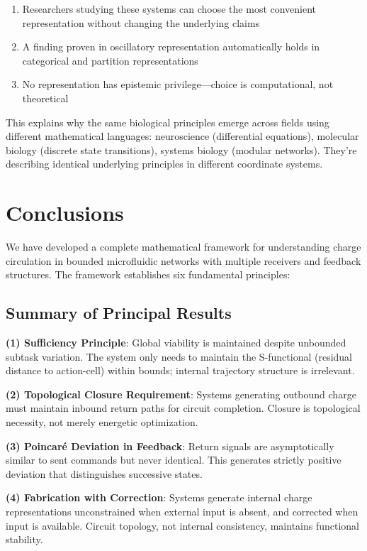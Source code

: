\documentclass[twocolumn,11pt,a4paper]{article}
\begin{document}
\begin{enumerate}[label=(\arabic*),leftmargin=*]
\item Researchers studying these systems can choose the most convenient representation without changing the underlying claims
\item A finding proven in oscillatory representation automatically holds in categorical and partition representations
\item No representation has epistemic privilege—choice is computational, not theoretical
\end{enumerate}

This explains why the same biological principles emerge across fields using different mathematical languages: neuroscience (differential equations), molecular biology (discrete state transitions), systems biology (modular networks). They're describing identical underlying principles in different coordinate systems.

\section{Conclusions}
\label{sec:conclusions}

We have developed a complete mathematical framework for understanding charge circulation in bounded microfluidic networks with multiple receivers and feedback structures. The framework establishes six fundamental principles:

\subsection{Summary of Principal Results}

\textbf{(1) Sufficiency Principle}: Global viability is maintained despite unbounded subtask variation. The system only needs to maintain the S-functional (residual distance to action-cell) within bounds; internal trajectory structure is irrelevant.

\textbf{(2) Topological Closure Requirement}: Systems generating outbound charge must maintain inbound return paths for circuit completion. Closure is topological necessity, not merely energetic optimization.

\textbf{(3) Poincaré Deviation in Feedback}: Return signals are asymptotically similar to sent commands but never identical. This generates strictly positive deviation that distinguishes successive states.

\textbf{(4) Fabrication with Correction}: Systems generate internal charge representations unconstrained when external input is absent, and corrected when input is available. Circuit topology, not internal consistency, maintains functional stability.
\end{document}
